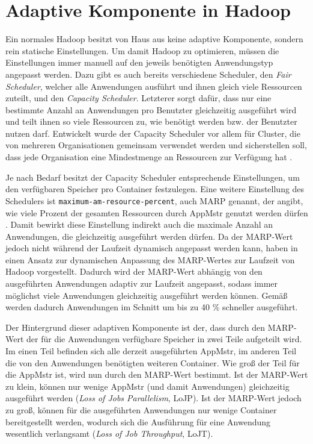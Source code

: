 \section{Adaptive Komponente in Hadoop}\label{sec:inriaSetting}

Ein normales Hadoop besitzt von Haus aus keine adaptive Komponente, sondern rein statische Einstellungen. Um damit Hadoop zu optimieren, müssen die Einstellungen immer manuell auf den jeweils benötigten Anwendungstyp angepasst werden. Dazu gibt es auch bereits verschiedene Scheduler, den \emph{Fair Scheduler}, welcher alle Anwendungen ausführt und ihnen gleich viele Ressourcen zuteilt, und den \emph{Capacity Scheduler}. Letzterer sorgt dafür, dass nur eine bestimmte Anzahl an Anwendungen pro Benutzter gleichzeitig ausgeführt wird und teilt ihnen so viele Ressourcen zu, wie benötigt werden bzw. der Benutzter nutzen darf. Entwickelt wurde der Capacity Scheduler vor allem für Cluster, die von mehreren Organisationen gemeinsam verwendet werden und sicherstellen soll, dass jede Organisation eine Mindestmenge an Ressourcen zur Verfügung hat \cite{HadoopCapScheduler271}.

Je nach Bedarf besitzt der Capacity Scheduler entsprechende Einstellungen, um \zB den verfügbaren Speicher pro Container festzulegen. Eine weitere Einstellung des Schedulers ist \texttt{maximum-am-resource-percent}, auch MARP genannt, der angibt, wie viele Prozent der gesamten Ressourcen durch \ac{AppMstr} genutzt werden dürfen \cite{HadoopCapScheduler271}. Damit bewirkt diese Einstellung indirekt auch die maximale Anzahl an Anwendungen, die gleichzeitig ausgeführt werden dürfen. Da der MARP-Wert jedoch nicht während der Laufzeit dynamisch angepasst werden kann, haben \citeauthor{zhang2016} in \cite{zhang2016} einen Ansatz zur dynamischen Anpassung des MARP-Wertes zur Laufzeit von Hadoop vorgestellt. Dadurch wird der MARP-Wert abhängig von den ausgeführten Anwendungen adaptiv zur Laufzeit angepasst, sodass immer möglichst viele Anwendungen gleichzeitig ausgeführt werden können. Gemäß \citeauthor{zhang2016} werden dadurch Anwendungen im Schnitt um bis zu 40 \% schneller ausgeführt.

Der Hintergrund dieser adaptiven Komponente ist der, dass durch den MARP-Wert der für die Anwendungen verfügbare Speicher in zwei Teile aufgeteilt wird. Im einen Teil befinden sich alle derzeit ausgeführten \ac{AppMstr}, im anderen Teil die von den Anwendungen benötigten weiteren Container. Wie groß der Teil für die \ac{AppMstr} ist, wird nun durch den MARP-Wert bestimmt. Ist der MARP-Wert zu klein, können nur wenige \ac{AppMstr} (und damit Anwendungen) gleichzeitig ausgeführt werden (\emph{Loss of Jobs Parallelism}, LoJP). Ist der MARP-Wert jedoch zu groß, können für die ausgeführten Anwendungen nur wenige Container bereitgestellt werden, wodurch sich die Ausführung für eine Anwendung wesentlich verlangsamt (\emph{Loss of Job Throughput}, LoJT)\cite{zhang2016}.

